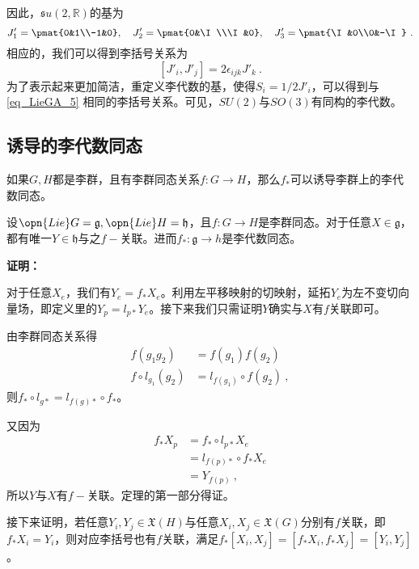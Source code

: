 因此，$\mathfrak su(2,\mathbb R)$的基为
\begin{equation}
J'_1=\pmat{0&1\\-1&0},\quad J'_2=\pmat{0&\I\\\I&0},\quad J'_3=\pmat{\I&0\\0&-\I}~.
\end{equation}
相应的，我们可以得到李括号关系为
\begin{equation}\label{eq_LieGA_4}
[J'_i,J'_j]=2\epsilon_{ijk} J'_k~.
\end{equation}
为了表示起来更加简洁，重定义李代数的基，使得$S_i=1/2J'_i$，可以得到与\autoref{eq_LieGA_5} 相同的李括号关系。可见，$SU(2)$与$SO(3)$有同构的李代数。
\subsection{诱导的李代数同态}
如果$G,H$都是李群，且有李群同态关系$f:G\to H$，那么$f_*$可以诱导李群上的李代数同态。
\begin{theorem}{}
设$\opn{Lie}G=\mathfrak g,\opn{Lie}H=\mathfrak h$，且$f:G\to H$是李群同态。对于任意$X\in \mathfrak g$，都有唯一$Y\in \mathfrak h$与之$f-$关联。进而$f_*:\mathfrak g\to h$是李代数同态。
\end{theorem}
\textbf{证明：}

对于任意$X_e$，我们有$Y_e=f_*X_e$。利用左平移映射的切映射，延拓$Y_e$为左不变切向量场，即定义里的$Y_p=l_{p*}Y_e$。接下来我们只需证明$Y$确实与$X$有$f$关联即可。

由李群同态关系得
\begin{equation}
\begin{aligned}
f(g_1g_2)&=f(g_1)f(g_2)\\
f\circ l_{g_1}(g_2)&=l_{f(g_1)}\circ f(g_2)~,
\end{aligned}
\end{equation}
则$f_*\circ l_{g*}=l_{f(g)*}\circ f_*$。

又因为
\begin{equation}
\begin{aligned}
f_*X_p&=f_*\circ l_{p*}X_e\\
&=l_{f(p)*}\circ f_*X_e\\
&=Y_{f(p)}~,
\end{aligned}
\end{equation}
所以$Y$与$X$有$f-$关联。定理的第一部分得证。

接下来证明，若任意$Y_i,Y_j\in \mathfrak{X}(H)$与任意$X_i,X_j\in \mathfrak{X}(G)$分别有$f$关联，即$f_*X_i=Y_i$，则对应李括号也有$f$关联，满足$f_*[X_i,X_j]=[f_*X_i,f_*X_j]=[Y_i,Y_j]$。

